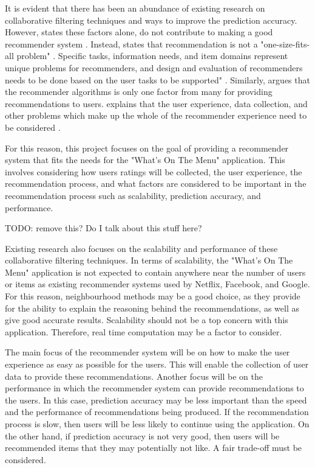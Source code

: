 It is evident that there has been an abundance of existing research on collaborative filtering techniques and ways to improve the prediction accuracy. However, \citeauthor{schafer2007collaborative} states these factors alone, do not contribute to making a good recommender system \cite{schafer2007collaborative}. Instead, \citeauthor{schafer2007collaborative} states that recommendation is not a "one-size-fits-all problem"  \cite{schafer2007collaborative}. Specific tasks, information needs, and item domains represent unique problems for recommenders, and design and evaluation of recommenders needs to be done based on the user tasks to be supported" \cite{schafer2007collaborative}. Similarly, \citeauthor{martin2009recsys} argues that the recommender algorithms is only one factor from many for providing recommendations to users. \citeauthor{martin2009recsys} explains that the user experience, data collection, and other problems which make up the whole of the recommender experience need to be considered \cite{schafer2007collaborative, martin2009recsys}.

For this reason, this project focuses on the goal of providing a recommender system that fits the needs for the "What's On The Menu" application. This involves considering how users ratings will be collected, the user experience, the recommendation process, and what factors are considered to be important in the recommendation process such as scalability, prediction accuracy, and performance.








TODO: remove this? Do I talk about this stuff here?


Existing research also focuses on the scalability and performance of these collaborative filtering techniques. In terms of scalability, the "What's On The Menu" application is not expected to contain anywhere near the number of users or items as existing recommender systems used by Netflix, Facebook, and Google. For this reason, neighbourhood methods may be a good choice, as they provide for the ability to explain the reasoning behind the recommendations, as well as give good accurate results. Scalability should not be a top concern with this application. Therefore, real time computation may be a factor to consider. 

The main focus of the recommender system will be on how to make the user experience as easy as possible for the users. This will enable the collection of user data to provide these recommendations. Another focus will be on the performance in which the recommender system can provide recommendations to the users. In this case, prediction accuracy may be less important than the speed and the performance of recommendations being produced. If the recommendation process is slow, then users will be less likely to continue using the application. On the other hand, if prediction accuracy is not very good, then users will be recommended items that they may potentially not like. A fair trade-off must be considered. 

